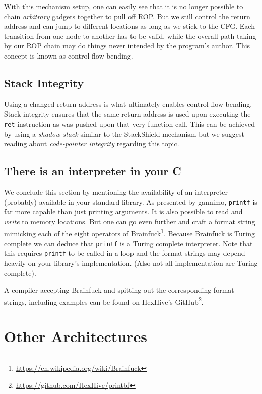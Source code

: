 \documentclass[article]{uibk}
\begin{document}
With this mechanism setup, one can easily see that it is no longer possible to
chain \emph{arbitrary} gadgets together to pull off ROP. But we still control
the return address and can jump to different locations as long as we stick to
the CFG. Each transition from one node to another has to be valid, while the
overall path taking by our ROP chain may do things never intended by the
program's author. This concept is known as control-flow bending.~
\cite{cf_bending}

\subsection{Stack Integrity}

Using a changed return address is what ultimately enables control-flow bending.
Stack integrity ensures that the same return address is used upon executing the
\texttt{ret} instruction as was pushed upon that very function call. This can
be achieved by using a \textit{shadow-stack} similar to the StackShield
mechanism but we suggest reading about \textit{code-pointer integrity}
\cite{cpi} regarding this topic.

\subsection{There is an interpreter in your C}

We conclude this section by mentioning the availability of an interpreter
(probably) available in your standard library. As presented by gannimo,
\texttt{printf} is far more capable than just printing arguments. It is also
possible to read and \emph{write} to memory locations. But one can go even
further and craft a format string mimicking each of the eight operators of
Brainfuck\footnote{\url{https://en.wikipedia.org/wiki/Brainfuck}}. Because
Brainfuck is Turing complete we can deduce that \texttt{printf} is a Turing
complete interpreter. Note that this requires \texttt{printf} to be called in a
loop and the format strings may depend heavily on your library's
implementation. (Also not all implementation are Turing complete).

A compiler accepting Brainfuck and spitting out the corresponding format
strings, including examples can be found on HexHive's
GitHub\footnote{\url{https://github.com/HexHive/printbf}}.

\section{Other Architectures}
\end{document}
